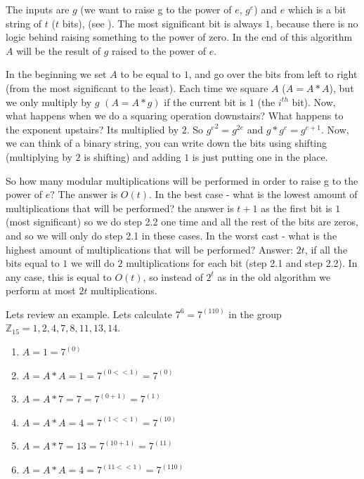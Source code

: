 The inputs are $g$ (we want to raise g to the power of $e$, \(g^e\)) and \(e\)
which is a bit string of $t$ ($t$ bits), (see ). 
The most significant bit is always $1$, because there is no
logic behind raising something to the power of zero. In the end of this algorithm \(A\)
will be the result of $g$ raised to the power of $e$. 

In the beginning we set $A$ to be equal to $1$, and go over the bits from left
to right (from the most significant to the least). Each time we square $A$ ($A=A*A$),
but we only multiply by $g$ $(A=A*g)$ if the current bit is $1$ (the \( i^{th}\) bit).
Now, what happens when we do a squaring
operation downstairs? What happens to the exponent upstairs? Its multiplied by
$2$. So \({g^{e}}^2 = g^{2e} \)  and  \(g*g^{e} = g^{e+1} \). Now, we can think
of a binary string, you can write down the bits using shifting (multiplying by
$2$ is shifting) and adding $1$ is just putting one in the place.

So how many modular multiplications will be performed in order to raise g to the
power of $e$? The answer is \(O(t)\). In the best case - what is the lowest amount of 
multiplications that will be performed? the answer
is $t+1$ as the first bit is $1$ (most significant) so we do step 2.2 one time and
all the rest of the bits are zeros, and so we will only do step 2.1 in these cases. 
In the worst cast - what is the highest amount of multiplications that will be performed? 
Answer: $2t$, if all the bits equal to $1$ we will do $2$ multiplications for 
each bit (step 2.1 and step 2.2). In any case, this is equal to \(O(t)\),
so instead of \(2^t\) as in the old algorithm we perform at most $2t$
multiplications. 

Lets review an example. Lets calculate \(7^6=7^{(110)}\) in the group \(
\mathbb{Z}_{15}={1, 2, 4 ,7, 8, 11, 13, 14} \).

\begin{enumerate}
	\item  \(A = 1 = 7^(0) \)
	\item  \(A = A*A = 1 = 7^{(0<<1)} = 7^{(0)}\)
	\item  \(A = A*7 = 7 = 7^{(0+1)} = 7^{(1)}\)
	\item  \(A = A*A = 4 = 7^{(1<<1)} = 7^{(10)} \)
	\item  \(A = A*7 = 13 = 7^{(10+1)} = 7^{(11)} \)
	\item  \( A = A*A = 4 = 7^{(11<<1)} = 7^{(110)} \)
\end{enumerate}

